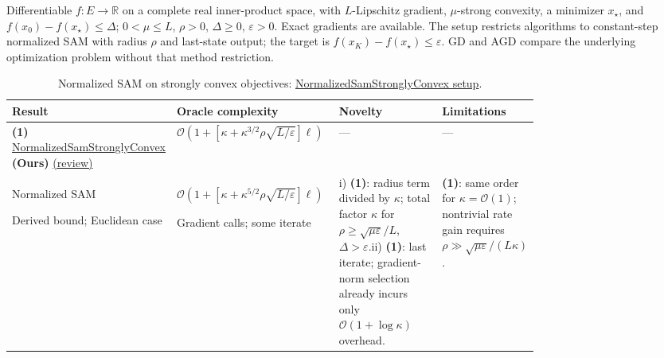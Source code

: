 \begin{table}[tp]
\centering
\caption{Normalized SAM on strongly convex objectives: \href{https://github.com/k3nfalt/longtails/blob/main/LongTails/Setups/NormalizedSamStronglyConvex.lean}{Normalized\allowbreak{}Sam\allowbreak{}Strongly\allowbreak{}Convex setup}.}\label{tab:NormalizedSamStronglyConvex}
\parbox{\linewidth}{\footnotesize Differentiable $f:E\to\mathbb{R}$ on a complete real inner-product space, with $L$-Lipschitz gradient, $\mu$-strong convexity, a minimizer $x_\star$, and $f(x_0)-f(x_\star)\le\Delta$; $0<\mu\le L$, $\rho>0$, $\Delta\ge0$, $\varepsilon>0$. Exact gradients are available. The setup restricts algorithms to constant-step normalized SAM with radius $\rho$ and last-state output; the target is $f(x_K)-f(x_\star)\le\varepsilon$. GD and AGD compare the underlying optimization problem without that method restriction.}\par\smallskip
\begin{threeparttable}
\footnotesize
\setlength{\tabcolsep}{4pt}\renewcommand{\arraystretch}{1.25}
\begin{tabularx}{\linewidth}{@{}>{\raggedright\arraybackslash}p{0.20\linewidth}>{\raggedright\arraybackslash}p{0.32\linewidth}>{\raggedright\arraybackslash}p{0.25\linewidth}>{\raggedright\arraybackslash}X@{}}
\toprule
\textbf{Result} & \textbf{Oracle complexity} & \textbf{Novelty} & \textbf{Limitations} \\
\midrule
\textbf{(1)} \href{https://github.com/k3nfalt/longtails/blob/main/LongTails/Theorems/NormalizedSamStronglyConvex.lean}{Normalized\allowbreak{}Sam\allowbreak{}Strongly\allowbreak{}Convex} \textbf{(Ours)} \href{https://github.com/k3nfalt/longtails/blob/main/scripts/reviews/NormalizedSamStronglyConvex.md}{(review)}
& $\mathcal{O}\!\left(1+\left[\kappa+\kappa^{3/2}\rho\sqrt{L/\varepsilon}\right]\ell\right)$
& ---
& --- \\
\midrule[1.2pt]
Normalized SAM \citep[App.~B.2, (6)]{nsscSiYun2023v3}\par Derived bound; Euclidean case
& $\mathcal{O}\!\left(1+\left[\kappa+\kappa^{5/2}\rho\sqrt{L/\varepsilon}\right]\ell\right)$\par Gradient calls; some iterate
& i) \textbf{(1)}: radius term divided by $\kappa$; total factor $\kappa$ for $\rho\ge\sqrt{\mu\varepsilon}/L$, $\Delta>\varepsilon$.\newline ii) \textbf{(1)}: last iterate; gradient-norm selection already incurs only $\mathcal{O}(1+\log\kappa)$ overhead.
& \textbf{(1)}: same order for $\kappa=\mathcal{O}(1)$; nontrivial rate gain requires $\rho\gg\sqrt{\mu\varepsilon}/(L\kappa)$. \\

\end{tabularx}
\end{threeparttable}
\end{table}
